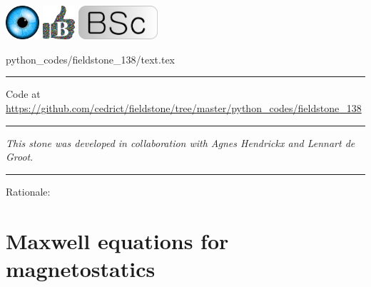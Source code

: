 \includegraphics[height=1.25cm]{images/pictograms/visualisation}
\includegraphics[height=1.25cm]{images/pictograms/benchmark}
\includegraphics[height=1.25cm]{images/pictograms/bsc}



\begin{flushright} {\tiny {\color{gray} python\_codes/fieldstone\_138/text.tex}} \end{flushright}



\par\noindent\rule{\textwidth}{0.4pt}

\begin{center}
Code at \url{https://github.com/cedrict/fieldstone/tree/master/python_codes/fieldstone_138}
\end{center}

\par\noindent\rule{\textwidth}{0.4pt}

{\sl This stone was developed in collaboration with Agnes Hendrickx
and Lennart de Groot}. 

\par\noindent\rule{\textwidth}{0.4pt}



Rationale:






\section*{Maxwell equations for magnetostatics}







